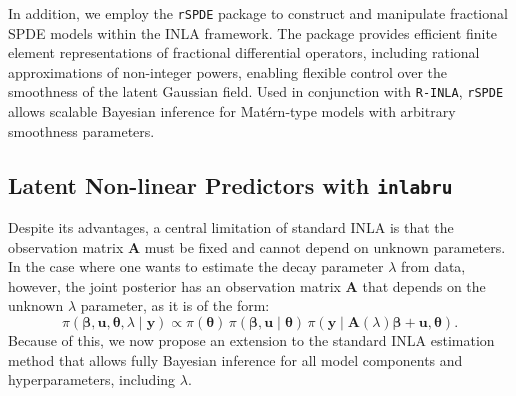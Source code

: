 \documentclass[
  12pt]{article}
\begin{document}
In addition, we employ the \texttt{rSPDE} package to construct and manipulate fractional SPDE models within the INLA framework. The package provides efficient finite element representations of fractional differential operators, including rational approximations of non-integer powers, enabling flexible control over the smoothness of the latent Gaussian field. Used in conjunction with \texttt{R-INLA}, \texttt{rSPDE} allows scalable Bayesian inference for Matérn-type models with arbitrary smoothness parameters.

\subsection{Latent Non-linear Predictors with \texttt{inlabru}}
Despite its advantages, a central limitation of standard INLA is that the observation matrix $\boldsymbol{A}$ must be fixed and cannot depend on unknown parameters. In the case where one wants to estimate the decay parameter $\lambda$ from data, however, the joint posterior has an observation matrix $\boldsymbol{A}$ that depends on the unknown $\lambda$ parameter, as it is of the form:
\[
\pi(\boldsymbol{\beta}, \boldsymbol{u}, \boldsymbol{\theta}, \lambda \mid \boldsymbol{y}) \propto 
   \pi(\boldsymbol{\theta})\,\pi(\boldsymbol{\beta},\boldsymbol{u} \mid \boldsymbol{\theta})\,\pi(\boldsymbol{y} \mid \boldsymbol{A}(\lambda)\boldsymbol{\beta} + \boldsymbol{u}, \boldsymbol{\theta}).
\]
Because of this, we now propose an extension to the standard INLA estimation method that allows fully Bayesian inference for all model components and hyperparameters, including $\lambda$.
\end{document}
